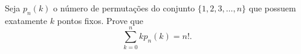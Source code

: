 Seja $p_n(k)$ o número de permutações do conjunto $\{1, 2, 3, \dots, n\}$ que possuem exatamente $k$ pontos     fixos. Prove que \[\sum_{k=0}^n kp_n(k) = n!.\]

